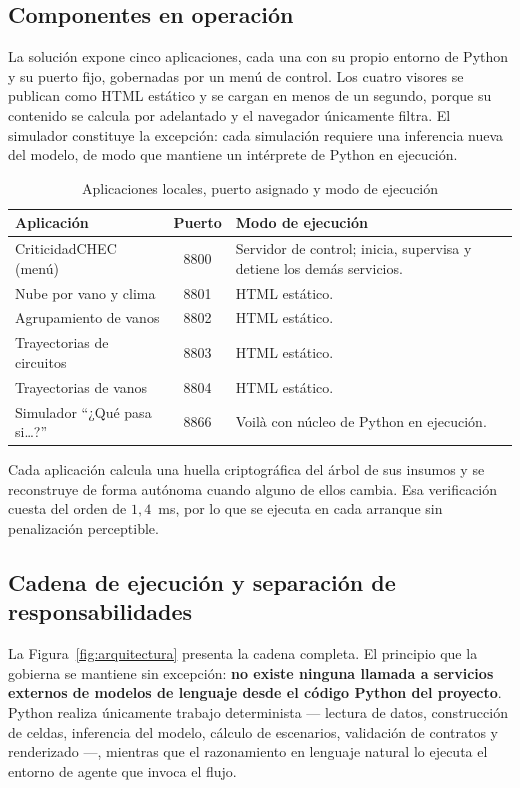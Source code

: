 \documentclass[11pt,a4paper]{article}
\begin{document}
\subsection{Componentes en operación}

La solución expone cinco aplicaciones, cada una con su propio entorno de Python y su puerto
fijo, gobernadas por un menú de control. Los cuatro visores se publican como HTML estático y
se cargan en menos de un segundo, porque su contenido se calcula por adelantado y el
navegador únicamente filtra. El simulador constituye la excepción: cada simulación requiere
una inferencia nueva del modelo, de modo que mantiene un intérprete de Python en ejecución.

\begin{table}[H]
\centering
\caption{Aplicaciones locales, puerto asignado y modo de ejecución}
\label{tab:tableros}
\small
\begin{tabularx}{\textwidth}{L{5.4cm} c X}
\toprule
\textbf{Aplicación} & \textbf{Puerto} & \textbf{Modo de ejecución} \\
\midrule
CriticidadCHEC (menú) & 8800 & Servidor de control; inicia, supervisa y detiene los demás servicios. \\
Nube por vano y clima & 8801 & HTML estático. \\
Agrupamiento de vanos & 8802 & HTML estático. \\
Trayectorias de circuitos & 8803 & HTML estático. \\
Trayectorias de vanos & 8804 & HTML estático. \\
Simulador ``¿Qué pasa si\ldots?'' & 8866 & Voilà con núcleo de Python en ejecución. \\
\bottomrule
\end{tabularx}
\end{table}

Cada aplicación calcula una huella criptográfica del árbol de sus insumos y se reconstruye de
forma autónoma cuando alguno de ellos cambia. Esa verificación cuesta del orden de
$1{,}4$~ms, por lo que se ejecuta en cada arranque sin penalización perceptible.

\subsection{Cadena de ejecución y separación de responsabilidades}

La Figura~\ref{fig:arquitectura} presenta la cadena completa. El principio que la gobierna se
mantiene sin excepción: \textbf{no existe ninguna llamada a servicios externos de modelos de
lenguaje desde el código Python del proyecto}. Python realiza únicamente trabajo determinista
--- lectura de datos, construcción de celdas, inferencia del modelo, cálculo de escenarios,
validación de contratos y renderizado ---, mientras que el razonamiento en lenguaje natural lo
ejecuta el entorno de agente que invoca el flujo.
\end{document}
